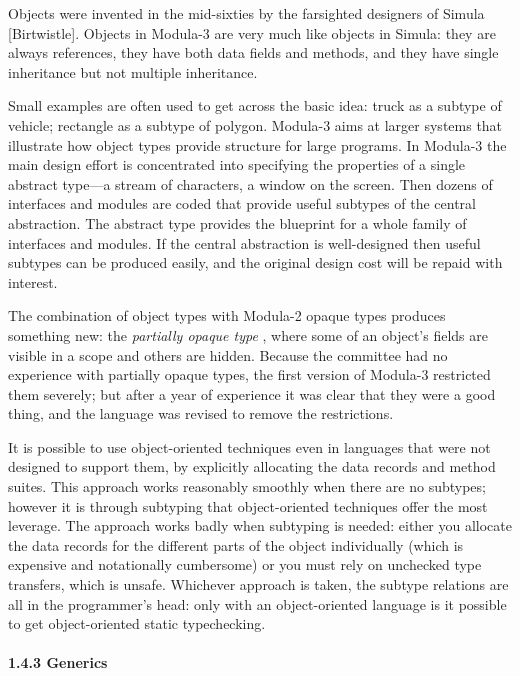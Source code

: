 \documentclass[10pt]{article}
\begin{document}
Objects were invented in the mid-sixties by the farsighted designers of Simula
[Birtwistle]. Objects in Modula-3 are very much like objects in Simula: they
are always references, they have both data fields and methods, and they have
single inheritance but not multiple inheritance.

Small examples are often used to get across the basic idea: truck as a subtype
of vehicle; rectangle as a subtype of polygon. Modula-3 aims at larger systems
that illustrate how object types provide structure for large programs. In
Modula-3 the main design effort is concentrated into specifying the properties
of a single abstract type---a stream of characters, a window on the
screen. Then dozens of interfaces and modules are coded that provide useful
subtypes of the central abstraction. The abstract type provides the blueprint
for a whole family of interfaces and modules. If the central abstraction is
well-designed then useful subtypes can be produced easily, and the original
design cost will be repaid with interest.

The combination of object types with Modula-2 opaque types produces something
new: the \emph{partially opaque type} , where some of an object's fields are
visible in a scope and others are hidden. Because the committee had no
experience with partially opaque types, the first version of Modula-3
restricted them severely; but after a year of experience it was clear that
they were a good thing, and the language was revised to remove the
restrictions.

It is possible to use object-oriented techniques even in languages that were
not designed to support them, by explicitly allocating the data records and
method suites. This approach works reasonably smoothly when there are no
subtypes; however it is through subtyping that object-oriented techniques
offer the most leverage. The approach works badly when subtyping is needed:
either you allocate the data records for the different parts of the object
individually (which is expensive and notationally cumbersome) or you must rely
on unchecked type transfers, which is unsafe. Whichever approach is taken, the
subtype relations are all in the programmer's head: only with an
object-oriented language is it possible to get object-oriented static
typechecking.

\paragraph{1.4.3 Generics}
\end{document}

